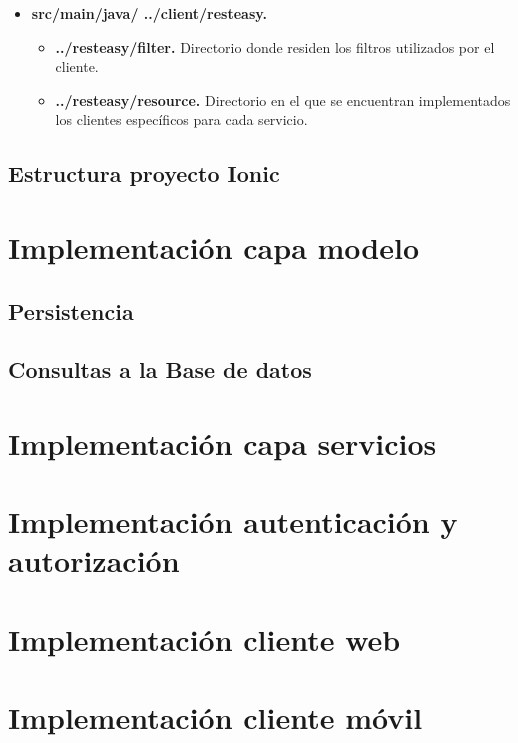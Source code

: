 \begin{itemize}
	\item \textbf{src/main/java/ ../client/resteasy. }
	\begin{itemize}
		\item \textbf{../resteasy/filter. } Directorio donde residen los filtros utilizados por el cliente.
		\item \textbf{../resteasy/resource. } Directorio en el que se encuentran implementados los clientes específicos para cada servicio.
	\end{itemize}
\end{itemize}


\subsection{Estructura proyecto Ionic}


\section{Implementación capa modelo}


\subsection{Persistencia}


\subsection{Consultas a la Base de datos}


\section{Implementación capa servicios}


\section{Implementación autenticación y autorización}


\section{Implementación cliente web}


\section{Implementación cliente móvil}
